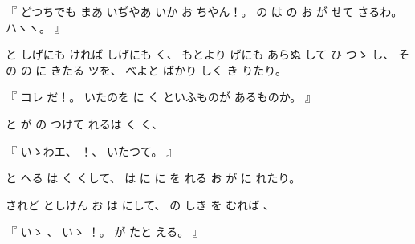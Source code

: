 %
『
どつちでも
まあ
いぢやあ
いか
お
ちやん！。
%
の
は
の
お
が
せて
さるわ。
%
ハヽヽ。
』

%
と
しげにも
ければ
しげにも
く、
%
もとより
げにも
あらぬ
して
ひ
つゝ%
し、
%
その
の
に
きたる
ツを、
%
べよと
ばかり
しく
き
りたり。

%
『
コレ
だ！。
%
いたのを
に
く%
といふものが
あるものか。
』

%
と
が
の
つけて
れるは
く
く、

%
『
いゝわエ、%
%
！、
%
いたつて。%
』

%
と
へる
は
く
くして、
%
は
に
に
を
れる
お
が
に
れたり。

%
されど
としけん
お
は
にして、
%
の
しき
を
むれば
、

%
『
いゝ%
、
%
いゝ%
！。
%
が
たと
える。
』

